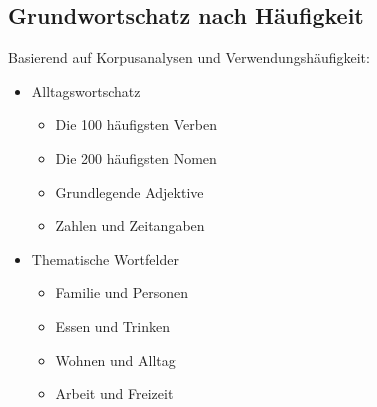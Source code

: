 \subsection{Grundwortschatz nach Häufigkeit}
Basierend auf Korpusanalysen und Verwendungshäufigkeit:
\begin{itemize}
    \item Alltagswortschatz
    \begin{itemize}
        \item Die 100 häufigsten Verben
        \item Die 200 häufigsten Nomen
        \item Grundlegende Adjektive
        \item Zahlen und Zeitangaben
    \end{itemize}
    
    \item Thematische Wortfelder
    \begin{itemize}
        \item Familie und Personen
        \item Essen und Trinken
        \item Wohnen und Alltag
        \item Arbeit und Freizeit
    \end{itemize}
\end{itemize}

